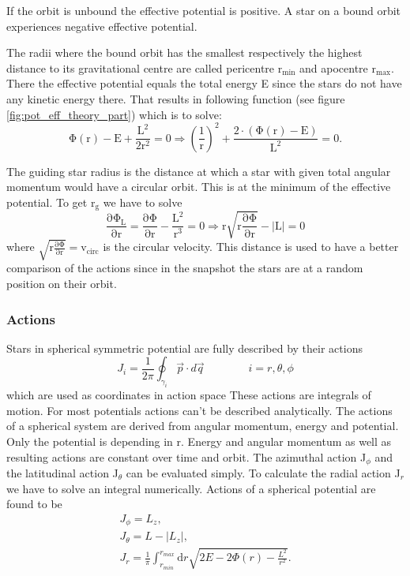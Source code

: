 If the orbit is unbound the effective potential is positive. A star on a bound orbit experiences negative effective potential. 
\par The radii where the bound orbit has the smallest respectively the highest distance to its gravitational centre are called pericentre \(\mathrm{r_{min}}\)  and apocentre \(\mathrm{r_{max}}\).  There the effective potential equals the total energy E since the stars do not have any kinetic energy there. That results in following function (see figure \ref{fig:pot_eff_theory_part}) which is to solve: 
\begin{equation}\label{eq:root_pot_eff}
\mathrm {\Phi(r)-E +\frac{L^2}{2r^2}=0\Rightarrow\left(\frac{1}{r}\right)^2+\frac{2\cdot (\Phi(r)-E)}{L^2}=0.}
\end{equation}
\par The guiding star radius is the distance at which a star with given total angular momentum would have a circular orbit. This is at the minimum of the effective potential. To get \(\mathrm{r_g}\) we have to solve
\begin{equation}\label{eq:min_pot_eff}
\mathrm{\frac{\partial\Phi_L}{\partial r}=\frac{\partial\Phi}{\partial r}-\frac{L^2}{r^3}=0\Rightarrow r\sqrt{r\frac{\partial\Phi}{\partial r}}-|L|=0}
\end{equation} where \(\mathrm{\sqrt{r\frac{\partial\Phi}{\partial r}}=v_{circ}}\) is the circular velocity. This distance is used to have a better comparison of the actions since in the snapshot the stars are at a random position on their orbit.

\subsubsection{Actions}\label{sec:actions}

Stars in spherical symmetric potential are fully described by their actions \begin{equation}
J_i=\frac{1}{2\pi}\oint_{\gamma_i}\vec{p}\cdot d\vec{q} \qquad\qquad i=r,\theta,\phi
\end{equation} which are used as coordinates in action space
These actions are integrals of motion. For most potentials actions can't be described analytically. The actions of a spherical system are derived from angular momentum, energy and potential. Only the potential is depending in r. Energy and angular momentum as well as resulting actions are constant over time and orbit. The azimuthal action J\(_\phi\) and the latitudinal action J\(_\theta\) can be evaluated simply. To calculate the radial action J\(_r\) we have to solve an integral numerically. Actions of a spherical potential are found to be 
\begin{align}\label{eq:actions}
J_\phi=L_z, \\ J_\theta=L-|L_z|, \\ J_r=\frac{1}{\pi} \int_{r_{min}}^{r_{max}} \mathrm{d}r \sqrt{2E-2\Phi(r)-\frac{L^2}{r^2}}. 
\end{align}

